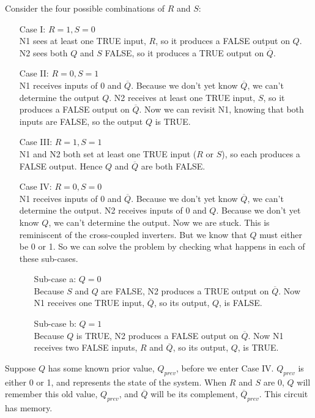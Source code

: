 \documentclass[12pt]{article}
\theoremstyle{definition}
\begin{document}
  Consider the four possible combinations of $R$ and $S$:
  \begin{itemize}
    \item[Case I:] $R = 1, S = 0$ \\
    N1 sees at least one TRUE input, $R$, so it produces a FALSE output on $Q$.
    N2 sees both $Q$ and $S$ FALSE, so it produces a TRUE output on $\overline{Q}$.
    \item[Case II:] $R = 0, S = 1$ \\
    N1 receives inputs of 0 and $\overline{Q}$.
    Because we don't yet know $\overline{Q}$, we can't determine the output $Q$.
    N2 receives at least one TRUE input, $S$, so it produces a FALSE output on $\overline{Q}$.
    Now we can revisit N1, knowing that both inputs are FALSE, so the output $Q$ is TRUE.
    \item[Case III:] $R = 1, S = 1$ \\
    N1 and N2 both set at least one TRUE input ($R$ or $S$), so each produces a FALSE output.
    Hence $Q$ and $\overline{Q}$ are both FALSE.
    \item[Case IV:] $R = 0, S = 0$ \\
    N1 receives inputs of 0 and $\overline{Q}$.
    Because we don't yet know $\overline{Q}$, we can't determine the output.
    N2 receives inputs of 0 and $Q$.
    Because we don't yet know $Q$, we can't determine the output.
    Now we are stuck.
    This is reminiscent of the cross-coupled inverters.
    But we know that $Q$ must either be 0 or 1.
    So we can solve the problem by checking what happens in each of these sub-cases.
    \begin{itemize}
      \item[Sub-case a:] $Q = 0$ \\
      Because $S$ and $Q$ are FALSE, N2 produces a TRUE output on $\overline{Q}$. Now N1 receives one TRUE input, $\overline{Q}$, so its output, $Q$, is FALSE.
      \item[Sub-case b:] $Q = 1$ \\
      Because $Q$ is TRUE, N2 produces a FALSE output on $\overline{Q}$. Now N1 receives two FALSE inputs, $R$ and $\overline{Q}$, so its output, $Q$, is TRUE.
    \end{itemize}
  \end{itemize}

  Suppose $Q$ has some known prior value, $Q_{prev}$, before we enter Case IV. $Q_{prev}$ is either 0 or 1, and represents the state of the system.
  When $R$ and $S$ are 0, $Q$ will remember this old value, $Q_{prev}$, and $\overline{Q}$ will be its complement, $\overline{Q}_{prev}$.
  This circuit has memory. \\
\end{document}
